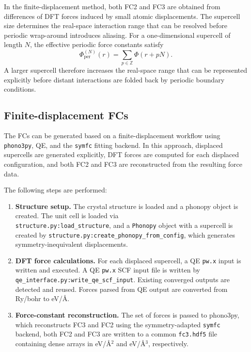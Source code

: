 In the finite-displacement method, both FC2 and FC3 are obtained from
differences of DFT forces induced by small atomic displacements.  The
supercell size determines the real-space interaction range that can be
resolved before periodic wrap-around introduces aliasing.  For a
one-dimensional supercell of length $N$, the effective periodic force
constants satisfy
\begin{equation}
  \Phi_{\mathrm{per}}^{(N)}(r)
  = \sum_{p\in\mathbb Z} \Phi(r+pN).
\end{equation}
A larger supercell therefore increases the real-space range that can be
represented explicitly before distant interactions are folded back by
periodic boundary conditions.

\subsection{Finite-displacement FCs}
\label{sec:finite_displacement}

The FCs can be generated based on a finite-displacement workflow
using \texttt{phono3py}, QE, and the \texttt{symfc} fitting backend.  In this
approach, displaced supercells are generated explicitly, DFT forces are
computed for each displaced configuration, and both FC2 and FC3 are
reconstructed from the resulting force data.

The following steps are performed:
\begin{enumerate}
  \item \textbf{Structure setup.}
        The crystal structure is loaded and a phonopy object is
        created. The unit cell is loaded via \\
        \texttt{structure.py:load\_structure}, and a
        \texttt{Phonopy} object with a supercell is
        created by
        \texttt{structure.py:create\_phonopy\_from\_config}, which
        generates symmetry-inequivalent displacements.
  \item \textbf{DFT force calculations.}
        For each displaced supercell, a QE \texttt{pw.x}
        input is written and executed.  A QE \texttt{pw.x} SCF input
        file is written by\\
        \texttt{qe\_interface.py:write\_qe\_scf\_input}.  Existing
        converged outputs are detected and reused.  Forces parsed from
        QE output are converted from Ry/bohr to eV/\AA.

  \item \textbf{Force-constant reconstruction.}
        The set of forces is passed to phono3py, which reconstructs FC3
        and FC2 using the symmetry-adapted \texttt{symfc} backend, both
        FC2 and FC3 are written to a common \texttt{fc3.hdf5} file
        containing dense arrays in eV/\AA$^2$ and eV/\AA$^3$,
        respectively.
\end{enumerate}

